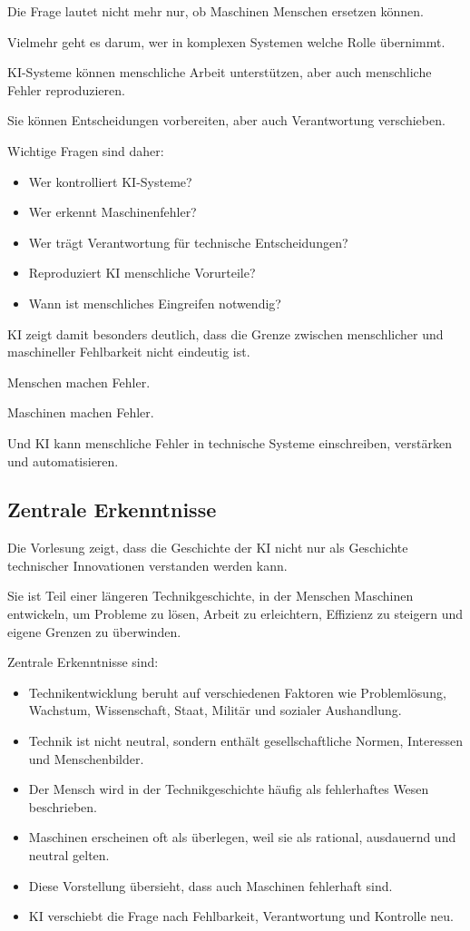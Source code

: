 Die Frage lautet nicht mehr nur,
ob Maschinen Menschen ersetzen können.

Vielmehr geht es darum,
wer in komplexen Systemen
welche Rolle übernimmt.

KI-Systeme können menschliche Arbeit unterstützen,
aber auch menschliche Fehler reproduzieren.

Sie können Entscheidungen vorbereiten,
aber auch Verantwortung verschieben.

Wichtige Fragen sind daher:

\begin{itemize}
\item Wer kontrolliert KI-Systeme?
\item Wer erkennt Maschinenfehler?
\item Wer trägt Verantwortung für technische Entscheidungen?
\item Reproduziert KI menschliche Vorurteile?
\item Wann ist menschliches Eingreifen notwendig?
\end{itemize}

KI zeigt damit besonders deutlich,
dass die Grenze zwischen menschlicher
und maschineller Fehlbarkeit
nicht eindeutig ist.

Menschen machen Fehler.

Maschinen machen Fehler.

Und KI kann menschliche Fehler
in technische Systeme einschreiben,
verstärken und automatisieren.

\subsection{Zentrale Erkenntnisse}

Die Vorlesung zeigt,
dass die Geschichte der KI
nicht nur als Geschichte technischer Innovationen
verstanden werden kann.

Sie ist Teil einer längeren Technikgeschichte,
in der Menschen Maschinen entwickeln,
um Probleme zu lösen,
Arbeit zu erleichtern,
Effizienz zu steigern
und eigene Grenzen zu überwinden.

Zentrale Erkenntnisse sind:

\begin{itemize}
\item Technikentwicklung beruht auf verschiedenen Faktoren wie Problemlösung, Wachstum, Wissenschaft, Staat, Militär und sozialer Aushandlung.
\item Technik ist nicht neutral, sondern enthält gesellschaftliche Normen, Interessen und Menschenbilder.
\item Der Mensch wird in der Technikgeschichte häufig als fehlerhaftes Wesen beschrieben.
\item Maschinen erscheinen oft als überlegen, weil sie als rational, ausdauernd und neutral gelten.
\item Diese Vorstellung übersieht, dass auch Maschinen fehlerhaft sind.
\item KI verschiebt die Frage nach Fehlbarkeit, Verantwortung und Kontrolle neu.
\end{itemize}

